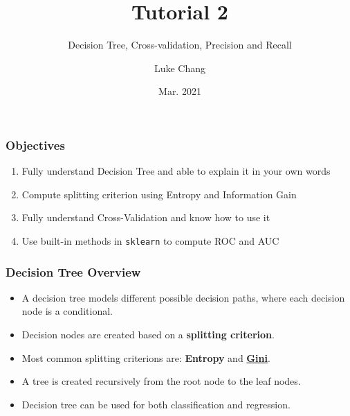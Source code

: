 \documentclass[aspectratio=169, 10pt]{beamer}
\title{Tutorial 2}
\subtitle{Decision Tree, Cross-validation, Precision and Recall}
\author{Luke Chang}
\institute{The University of Auckland}
\date{Mar. 2021}
\begin{document}
\frame{\titlepage}

\begin{frame}
\frametitle{Objectives}

\begin{enumerate}
    \item Fully understand Decision Tree and able to explain it in your own words
    \item Compute splitting criterion using Entropy and Information Gain
    \item Fully understand Cross-Validation and know how to use it
    \item Use built-in methods in \texttt{sklearn} to compute ROC and AUC
\end{enumerate}

\end{frame}

\begin{frame}
\frametitle{Decision Tree Overview}

\begin{itemize}
    \item A decision tree models different possible decision paths, where each decision node is a conditional.
    \item Decision nodes are created based on a \textbf{splitting criterion}.
    \item Most common splitting criterions are: \textbf{Entropy} and \textbf{\href{https://scikit-learn.org/stable/modules/tree.html}{Gini}}.
    \item A tree is created recursively from the root node to the leaf nodes. 
    \item Decision tree can be used for both classification and regression.
\end{itemize}

\end{frame}
\end{document}
